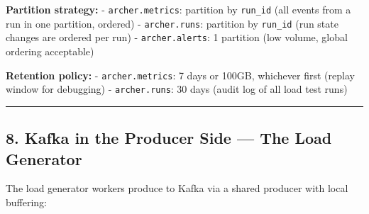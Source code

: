 \documentclass[
]{article}
\begin{document}
\textbf{Partition strategy:} - \texttt{archer.metrics}: partition by
\texttt{run\_id} (all events from a run in one partition, ordered) -
\texttt{archer.runs}: partition by \texttt{run\_id} (run state changes
are ordered per run) - \texttt{archer.alerts}: 1 partition (low volume,
global ordering acceptable)

\textbf{Retention policy:} - \texttt{archer.metrics}: 7 days or 100GB,
whichever first (replay window for debugging) - \texttt{archer.runs}: 30
days (audit log of all load test runs)

\begin{center}\rule{0.5\linewidth}{0.5pt}\end{center}

\hypertarget{kafka-in-the-producer-side-the-load-generator}{%
\subsection{8. Kafka in the Producer Side --- The Load
Generator}\label{kafka-in-the-producer-side-the-load-generator}}

The load generator workers produce to Kafka via a shared producer with
local buffering:
\end{document}
